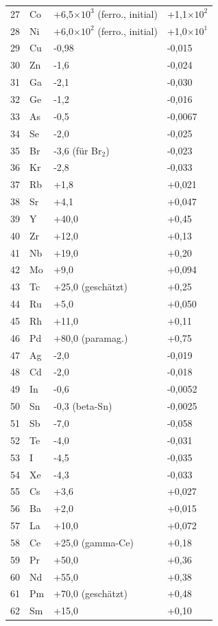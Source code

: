 \documentclass[12pt,a4paper]{article}
\begin{document}
\begin{longtable}{p{0.6cm}p{1.2cm}p{2.5cm}p{2.5cm}}
		27 & Co & +6,5\(\times10^3\) (ferro., initial) & +1,1\(\times10^2\) \\
		28 & Ni & +6,0\(\times10^2\) (ferro., initial) & +1,0\(\times10^1\) \\
		29 & Cu & -0,98 & -0,015 \\
		30 & Zn & -1,6 & -0,024 \\
		31 & Ga & -2,1 & -0,030 \\
		32 & Ge & -1,2 & -0,016 \\
		33 & As & -0,5 & -0,0067 \\
		34 & Se & -2,0 & -0,025 \\
		35 & Br & -3,6 (für Br\(_2\)) & -0,023 \\
		36 & Kr & -2,8 & -0,033 \\
		37 & Rb & +1,8 & +0,021 \\
		38 & Sr & +4,1 & +0,047 \\
		39 & Y  & +40,0 & +0,45 \\
		40 & Zr & +12,0 & +0,13 \\
		41 & Nb & +19,0 & +0,20 \\
		42 & Mo & +9,0 & +0,094 \\
		43 & Tc & +25,0 (geschätzt) & +0,25 \\
		44 & Ru & +5,0 & +0,050 \\
		45 & Rh & +11,0 & +0,11 \\
		46 & Pd & +80,0 (paramag.) & +0,75 \\
		47 & Ag & -2,0 & -0,019 \\
		48 & Cd & -2,0 & -0,018 \\
		49 & In & -0,6 & -0,0052 \\
		50 & Sn & -0,3 (beta-Sn) & -0,0025 \\
		51 & Sb & -7,0 & -0,058 \\
		52 & Te & -4,0 & -0,031 \\
		53 & I  & -4,5 & -0,035 \\
		54 & Xe & -4,3 & -0,033 \\
		55 & Cs & +3,6 & +0,027 \\
		56 & Ba & +2,0 & +0,015 \\
		57 & La & +10,0 & +0,072 \\
		58 & Ce & +25,0 (gamma-Ce) & +0,18 \\
		59 & Pr & +50,0 & +0,36 \\
		60 & Nd & +55,0 & +0,38 \\
		61 & Pm & +70,0 (geschätzt) & +0,48 \\
		62 & Sm & +15,0 & +0,10 \\

\end{longtable}
\end{document}
